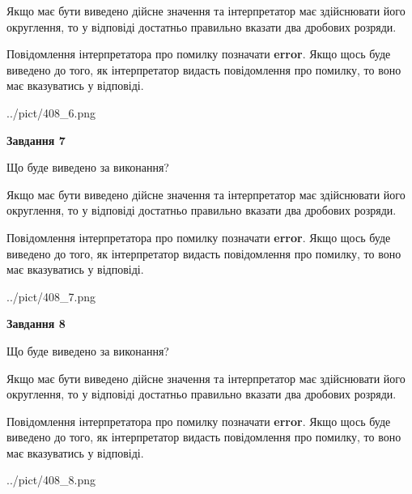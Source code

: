 \documentclass[12pt, ukrainian]{article}
\begin{document}
{\begin {Large}
Якщо має бути виведено дійсне значення та інтерпретатор має здійснювати його округлення, 
то у відповіді достатньо правильно вказати два дробових розряди.

Повідомлення інтерпретатора про помилку позначати \textbf{error}.
Якщо щось буде виведено до того, як інтерпретатор видасть повідомлення про помилку, 
то воно має вказуватись у відповіді. \par

\begin{center}
	{../pict/408_6.png}
\end{center}
\newpage

{\begin {center}\textbf{Завдання 7}\end {center}}\par
Що буде виведено за виконання? \par

Якщо має бути виведено дійсне значення та інтерпретатор має здійснювати його округлення, 
то у відповіді достатньо правильно вказати два дробових розряди.

Повідомлення інтерпретатора про помилку позначати \textbf{error}.
Якщо щось буде виведено до того, як інтерпретатор видасть повідомлення про помилку, 
то воно має вказуватись у відповіді. \par

\begin{center}
	{../pict/408_7.png}
\end{center}
\newpage

{\begin {center}\textbf{Завдання 8}\end {center}}\par
Що буде виведено за виконання? \par

Якщо має бути виведено дійсне значення та інтерпретатор має здійснювати його округлення, 
то у відповіді достатньо правильно вказати два дробових розряди.

Повідомлення інтерпретатора про помилку позначати \textbf{error}.
Якщо щось буде виведено до того, як інтерпретатор видасть повідомлення про помилку, 
то воно має вказуватись у відповіді. \par

\begin{center}
	{../pict/408_8.png}
\end{center}
\newpage


\end{Large}}
\end{document}
